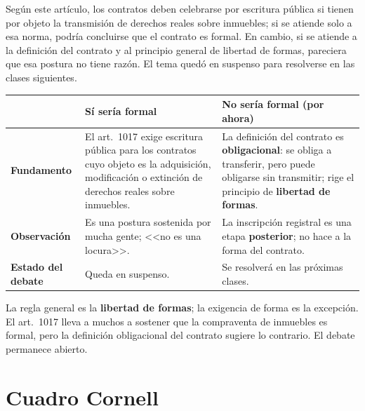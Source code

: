 \documentclass[12pt,oneside]{book}
\begin{document}
Según este artículo, los contratos deben celebrarse por escritura pública si tienen por objeto la transmisión de derechos reales sobre inmuebles; si se atiende solo a esa norma, podría concluirse que el contrato es formal. En cambio, si se atiende a la definición del contrato y al principio general de libertad de formas, pareciera que esa postura no tiene razón. El tema quedó en suspenso para resolverse en las clases siguientes.

\begin{table}[H]
\centering
\small
\begin{tabularx}{\textwidth}{>{\raggedright\arraybackslash}p{} >{\raggedright\arraybackslash}X >{\raggedright\arraybackslash}X}
\toprule
 & \textbf{Sí sería formal} & \textbf{No sería formal (por ahora)} \\
\midrule
\textbf{Fundamento} &
El art.~1017 exige escritura pública para los contratos cuyo objeto es la adquisición, modificación o extinción de derechos reales sobre inmuebles. &
La definición del contrato es \textbf{obligacional}: se obliga a transferir, pero puede obligarse sin transmitir; rige el principio de \textbf{libertad de formas}. \\

\textbf{Observación} &
Es una postura sostenida por mucha gente; <<no es una locura>>. &
La inscripción registral es una etapa \textbf{posterior}; no hace a la forma del contrato. \\

\textbf{Estado del debate} &
Queda en suspenso. &
Se resolverá en las próximas clases. \\
\bottomrule
\end{tabularx}
\end{table}

\begin{important}
La regla general es la \textbf{libertad de formas}; la exigencia de forma es la excepción. El art.~1017 lleva a muchos a sostener que la compraventa de inmuebles es formal, pero la definición obligacional del contrato sugiere lo contrario. El debate permanece abierto.
\end{important}

\section{Cuadro Cornell}
\end{document}
